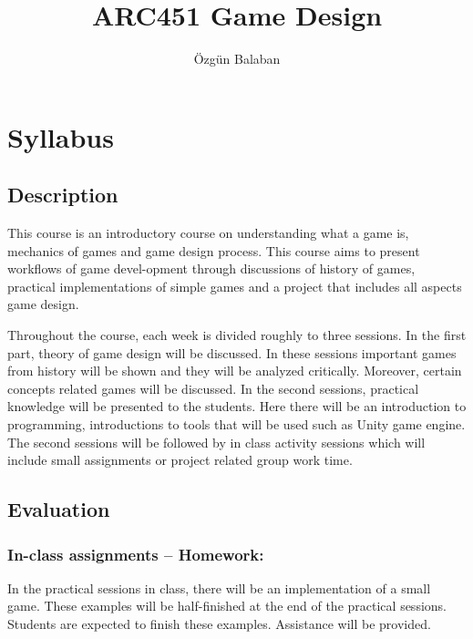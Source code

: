 \documentclass[
]{book}
\title{ARC451 Game Design}
\author{Özgün Balaban}
\date{}
\begin{document}
\maketitle

{
\setcounter{tocdepth}{1}
\tableofcontents
}
\hypertarget{intro}{%
\chapter{Syllabus}\label{intro}}

\hypertarget{description}{%
\section{Description}\label{description}}

This course is an introductory course on understanding what a game is, mechanics of games and game design process. This course aims to present workflows of game devel-opment through discussions of history of games, practical implementations of simple games and a project that includes all aspects game design.

Throughout the course, each week is divided roughly to three sessions. In the first part, theory of game design will be discussed. In these sessions important games from history will be shown and they will be analyzed critically. Moreover, certain concepts related games will be discussed. In the second sessions, practical knowledge will be presented to the students. Here there will be an introduction to programming, introductions to tools that will be used such as Unity game engine. The second sessions will be followed by in class activity sessions which will include small assignments or project related group work time.

\hypertarget{evaluation}{%
\section{Evaluation}\label{evaluation}}

\hypertarget{in-class-assignments-homework}{%
\subsection{In-class assignments -- Homework:}\label{in-class-assignments-homework}}

In the practical sessions in class, there will be an implementation of a small game. These examples will be half-finished at the end of the practical sessions. Students are expected to finish these examples. Assistance will be provided.
\end{document}
